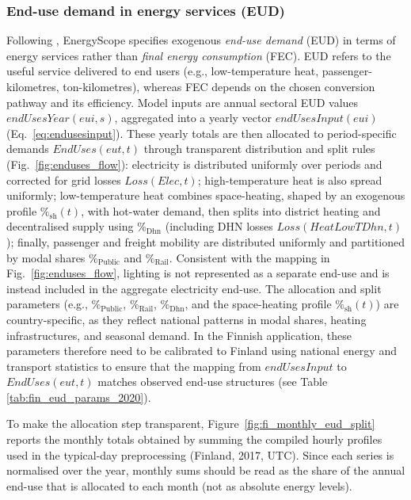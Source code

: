 \documentclass{article}
\begin{document}
\subsubsection{End-use demand in energy services (EUD)}
Following \citet{moret_strategic_2017}, EnergyScope specifies exogenous \emph{end-use demand} (EUD) in terms of energy services rather than \emph{final energy consumption} (FEC). EUD refers to the useful service delivered to end users (e.g., low-temperature heat, passenger-kilometres, ton-kilometres), whereas FEC depends on the chosen conversion pathway and its efficiency. Model inputs are annual sectoral EUD values $endUsesYear(eui,s)$, aggregated into a yearly vector $endUsesInput(eui)$ (Eq.~\eqref{eq:endusesinput}). These yearly totals are then allocated to period-specific demands $EndUses(eut,t)$ through transparent distribution and split rules (Fig.~\ref{fig:enduses_flow}): electricity is distributed uniformly over periods and corrected for grid losses $Loss(Elec,t)$; high-temperature heat is also spread uniformly; low-temperature heat combines space-heating, shaped by an exogenous profile $\%_{\mathrm{sh}}(t)$, with hot-water demand, then splits into district heating and decentralised supply using $\%_{\mathrm{Dhn}}$ (including DHN losses $Loss(HeatLowTDhn,t)$); finally, passenger and freight mobility are distributed uniformly and partitioned by modal shares $\%_{\mathrm{Public}}$ and $\%_{\mathrm{Rail}}$. Consistent with the mapping in Fig.~\ref{fig:enduses_flow}, lighting is not represented as a separate end-use and is instead included in the aggregate electricity end-use. The allocation and split parameters (e.g., $\%_{\mathrm{Public}}$, $\%_{\mathrm{Rail}}$, $\%_{\mathrm{Dhn}}$, and the space-heating profile $\%_{\mathrm{sh}}(t)$) are country-specific, as they reflect national patterns in modal shares, heating infrastructures, and seasonal demand. In the Finnish application, these parameters therefore need to be calibrated to Finland using national energy and transport statistics to ensure that the mapping from $endUsesInput$ to $EndUses(eut,t)$ matches observed end-use structures (see Table \ref{tab:fin_eud_params_2020}).


To make the allocation step transparent, Figure~\ref{fig:fi_monthly_eud_split} reports the monthly totals obtained by summing the compiled hourly profiles used in the typical-day preprocessing (Finland, 2017, UTC). Since each series is normalised over the year, monthly sums should be read as the share of the annual end-use that is allocated to each month (not as absolute energy levels).
\end{document}
